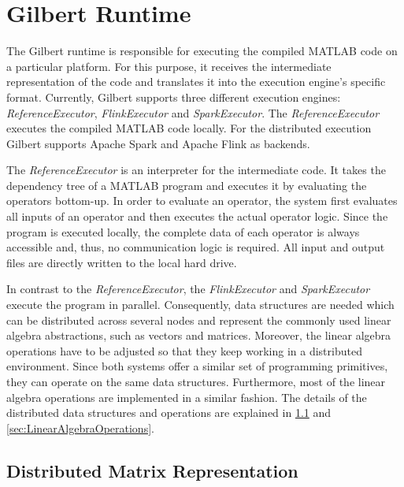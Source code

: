 \section{Gilbert Runtime}
\label{sec:gilbertRuntime}

The Gilbert runtime is responsible for executing the compiled MATLAB code on a particular platform. 
For this purpose, it receives the intermediate representation of the code and translates it into the execution engine's specific format. 
Currently, Gilbert supports three different execution engines: \emph{ReferenceExecutor}, \emph{FlinkExecutor} and \emph{SparkExecutor}. 
The \emph{ReferenceExecutor} executes the compiled MATLAB code locally. 
For the distributed execution Gilbert supports Apache Spark and Apache Flink as backends. 

The \emph{ReferenceExecutor} is an interpreter for the intermediate code.
It takes the dependency tree of a MATLAB program and executes it by evaluating the operators bottom-up. 
In order to evaluate an operator, the system first evaluates all inputs of an operator and then executes the actual operator logic. 
Since the program is executed locally, the complete data of each operator is always accessible and, thus, no communication logic is required. 
All input and output files are directly written to the local hard drive. 

In contrast to the \emph{ReferenceExecutor}, the \emph{FlinkExecutor} and \emph{SparkExecutor} execute the program in parallel. 
Consequently, data structures are needed which can be distributed across several nodes and represent the commonly used linear algebra abstractions, such as vectors and matrices. 
Moreover, the linear algebra operations have to be adjusted so that they keep working in a distributed environment. 
Since both systems offer a similar set of programming primitives, they can operate on the same data structures. 
Furthermore, most of the linear algebra operations are implemented in a similar fashion.
The details of the distributed data structures and operations are explained in \cref{sec:DistributedMatrixRepresentation} and \cref{sec:LinearAlgebraOperations}.

\subsection{Distributed Matrix Representation}
\label{sec:DistributedMatrixRepresentation}

